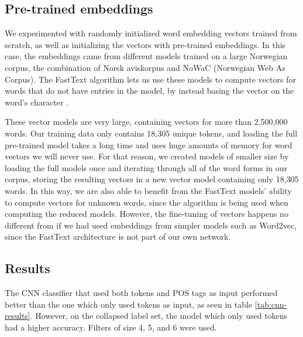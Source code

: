\subsection{Pre-trained embeddings}

We experimented with randomly initialized word embedding vectors trained from
scratch, as well as initializing the vectors with pre-trained embeddings. In
this case, the embeddings came from different models trained on a large
Norwegian corpus, the combination of Norsk aviskorpus and NoWaC (Norwegian
Web As Corpus). The FastText algorithm lets us use these models to compute
vectors for words that do not have entries in the model, by instead basing
the vector on the word's character \ngrams.

These vector models are very large, containing vectors for more than
2,500,000 words. Our training data only contains 18,305 unique tokens, and
loading the full pre-trained model takes a long time and uses huge amounts of
memory for word vectors we will never use. For that reason, we created models
of smaller size by loading the full models once and iterating through all of
the word forms in our corpus, storing the resulting vectors in a new vector
model containing only 18,305 words. In this way, we are also able to benefit
from the FastText models' ability to compute vectors for unknown words, since
the \ngram algorithm is being used when computing the reduced models.
However, the fine-tuning of vectors happens no different from if we had used
embeddings from simpler models such as Word2vec, since the FastText
architecture is not part of our own network.


\subsection{Results}

The \ac{CNN} classifier that used both tokens and POS tags as input performed
better than the one which only used tokens as input, as seen in table
\ref{tab:cnn-results}. However, on the collapsed label set, the model which only
used tokens had a higher accuracy. Filters of size 4, 5, and 6 were used.

